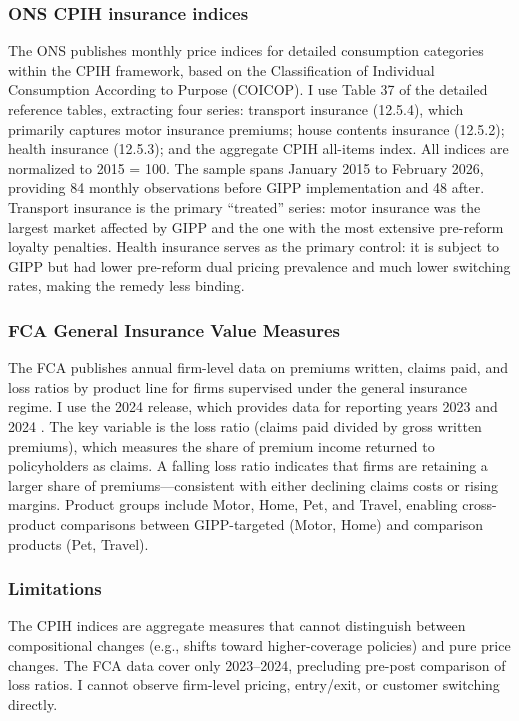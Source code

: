 \documentclass[12pt]{article}
\begin{document}
\subsubsection*{ONS CPIH insurance indices} The ONS publishes monthly price indices for detailed consumption categories within the CPIH framework, based on the Classification of Individual Consumption According to Purpose (COICOP). I use Table 37 of the detailed reference tables, extracting four series: transport insurance (12.5.4), which primarily captures motor insurance premiums; house contents insurance (12.5.2); health insurance (12.5.3); and the aggregate CPIH all-items index. All indices are normalized to 2015 = 100. The sample spans January 2015 to February 2026, providing 84 monthly observations before GIPP implementation and 48 after. Transport insurance is the primary ``treated'' series: motor insurance was the largest market affected by GIPP and the one with the most extensive pre-reform loyalty penalties. Health insurance serves as the primary control: it is subject to GIPP but had lower pre-reform dual pricing prevalence and much lower switching rates, making the remedy less binding.

\subsubsection*{FCA General Insurance Value Measures} The FCA publishes annual firm-level data on premiums written, claims paid, and loss ratios by product line for firms supervised under the general insurance regime. I use the 2024 release, which provides data for reporting years 2023 and 2024 \citep{fca2024gvm}. The key variable is the loss ratio (claims paid divided by gross written premiums), which measures the share of premium income returned to policyholders as claims. A falling loss ratio indicates that firms are retaining a larger share of premiums---consistent with either declining claims costs or rising margins. Product groups include Motor, Home, Pet, and Travel, enabling cross-product comparisons between GIPP-targeted (Motor, Home) and comparison products (Pet, Travel).

\subsubsection*{Limitations} The CPIH indices are aggregate measures that cannot distinguish between compositional changes (e.g., shifts toward higher-coverage policies) and pure price changes. The FCA data cover only 2023--2024, precluding pre-post comparison of loss ratios. I cannot observe firm-level pricing, entry/exit, or customer switching directly.
\end{document}
